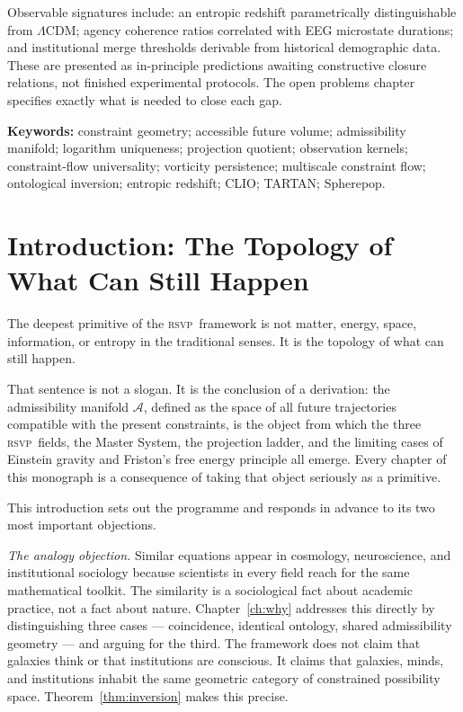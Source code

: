 \documentclass[12pt, oneside]{book}
\theoremstyle{plain}
\theoremstyle{definition}
\newcommand{\RSVP}{\textsc{rsvp}}
\newcommand{\LCDM}{$\Lambda$CDM}
\newcommand{\Adm}{\mathcal{A}}
\begin{document}
Observable signatures include: an entropic redshift parametrically distinguishable
from \LCDM; agency coherence ratios correlated with EEG microstate durations; and
institutional merge thresholds derivable from historical demographic data. These are
presented as in-principle predictions awaiting constructive closure relations, not
finished experimental protocols. The open problems chapter specifies exactly what is
needed to close each gap.

\vspace{1em}
\noindent\textbf{Keywords:} constraint geometry; accessible future volume; admissibility
manifold; logarithm uniqueness; projection quotient; observation kernels; constraint-flow
universality; vorticity persistence; multiscale constraint flow; ontological inversion;
entropic redshift; CLIO; TARTAN; Spherepop.
\clearpage

\tableofcontents
\clearpage

\mainmatter

\chapter{Introduction: The Topology of What Can Still Happen}
\label{ch:intro}

The deepest primitive of the \RSVP\ framework is not matter, energy, space,
information, or entropy in the traditional senses. It is the topology of what can
still happen.

That sentence is not a slogan. It is the conclusion of a derivation: the admissibility
manifold $\Adm$, defined as the space of all future trajectories compatible with the
present constraints, is the object from which the three \RSVP\ fields, the Master
System, the projection ladder, and the limiting cases of Einstein gravity and
Friston's free energy principle all emerge. Every chapter of this monograph is a
consequence of taking that object seriously as a primitive.

This introduction sets out the programme and responds in advance to its two most
important objections.

\textit{The analogy objection.} Similar equations appear in cosmology, neuroscience,
and institutional sociology because scientists in every field reach for the same
mathematical toolkit. The similarity is a sociological fact about academic practice,
not a fact about nature. Chapter~\ref{ch:why} addresses this directly by distinguishing
three cases --- coincidence, identical ontology, shared admissibility geometry ---
and arguing for the third. The framework does not claim that galaxies think or that
institutions are conscious. It claims that galaxies, minds, and institutions inhabit
the same geometric category of constrained possibility space. Theorem~\ref{thm:inversion}
makes this precise.
\end{document}
